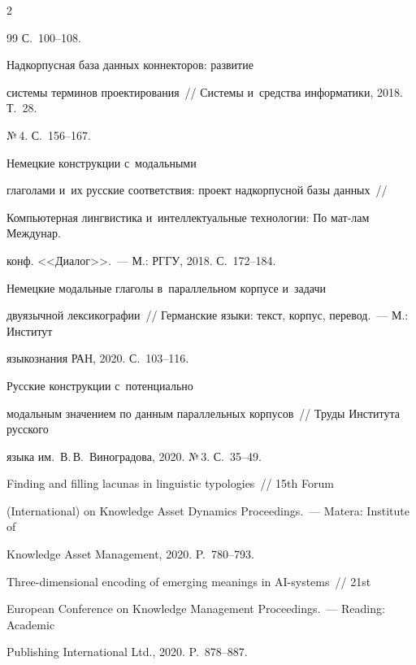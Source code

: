\begin{multicols}{2}
{{\begin{thebibliography}{99}
С.~100--108.




 Надкорпусная база данных коннекторов: развитие 


системы терминов проектирования~// Системы и~средства информатики, 2018. Т.~28. 


№\,4. С.~156--167.




 Немецкие конструкции с~модальными 


глаголами и~их русские соответствия: проект надкорпусной базы данных~//\linebreak 


Компьютерная лингвистика и~интеллектуальные технологии: По мат-лам Междунар. 


конф. <<Диалог>>.~--- М.: РГГУ, 2018. С.~172--184.




 Немецкие модальные глаголы в~параллельном корпусе и~задачи 


двуязычной лексикографии~// Германские языки: текст, корпус, перевод.~--- М.: Институт 


языкознания РАН, 2020. С.~103--116.




 Русские конструкции с~потенциально 


модальным значением по данным параллельных корпусов~// Труды Института русского 


языка им.\ В.\,В.~Виноградова, 2020. №\,3. С.~35--49.




 Finding and filling lacunas in linguistic typologies~// 15th  Forum 


(International) on Knowledge Asset Dynamics Proceedings.~--- Matera: Institute of 


Knowledge Asset Management, 2020. P.~780--793.




 Three-dimensional encoding of emerging meanings in AI-systems~// 21st 


European Conference on Knowledge Management Proceedings.~--- Reading: Academic 


Publishing International Ltd., 2020. P.~878--887.





\end{thebibliography}}}
\end{multicols}
